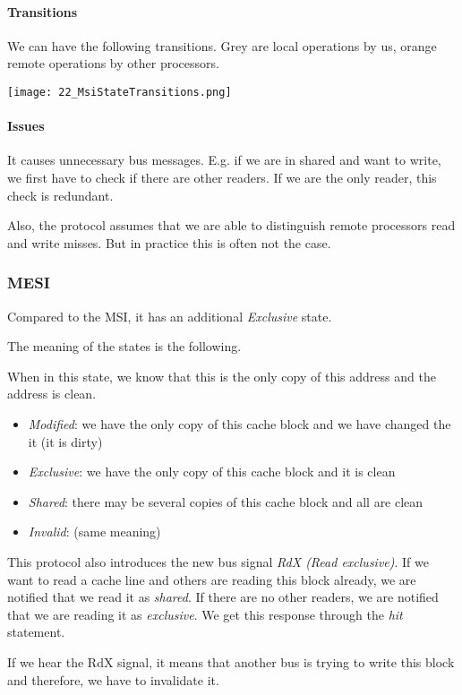\paragraph{Transitions}
We can have the following transitions. Grey are local operations by us, orange remote operations by other processors.

\texttt{[image: 22\_MsiStateTransitions.png]}

\paragraph{Issues}
It causes unnecessary bus messages. E.g. if we are in shared and want to write, we first have to check if there are other readers. If we are the only reader, this check is redundant.

Also, the protocol assumes that we are able to distinguish remote processors read and write misses. But in practice this is often not the case. 

\subsubsection{MESI}
Compared to the MSI, it has an additional \textit{Exclusive} state.

The meaning of the states is the following.

When in this state, we know that this is the only copy of this address and the address is clean. 

\begin{itemize}
    \item \textit{Modified}: we have the only copy of this cache block and we have changed the it (it is dirty)
    \item \textit{Exclusive}: we have the only copy of this cache block and it is clean
    \item \textit{Shared}: there may be several copies of this cache block and all are clean
    \item \textit{Invalid}: (same meaning)
\end{itemize}

This protocol also introduces the new bus signal \textit{RdX (Read exclusive)}. If we want to read a cache line and others are reading this block already, we are notified that we read it as \textit{shared}. If there are no other readers, we are notified that we are reading it as \textit{exclusive}. We get this response through the \textit{hit} statement. 

If we hear the RdX signal, it means that another bus is trying to write this block and therefore, we have to invalidate it. 

